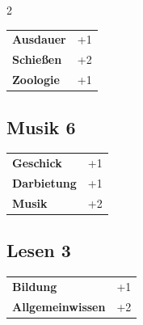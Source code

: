 \begin{multicols}{2}
\begin{tcolorbox}
\begin{tabular}{@{}ll@{}}
    \textbf{Ausdauer} & +1\\
    \textbf{Schießen} & +2\\
    \textbf{Zoologie} & +1\\
\end{tabular}


\end{tcolorbox}

\begin{tcolorbox}
    \subsection*{Musik \hfill \small{6 }}
    \tcblower




\begin{tabular}{@{}ll@{}}
    \textbf{Geschick} & +1\\
    \textbf{Darbietung} & +1\\
    \textbf{Musik} & +2\\
\end{tabular}


\end{tcolorbox}

\begin{tcolorbox}
    \subsection*{Lesen \hfill \small{3 }}
    \tcblower




\begin{tabular}{@{}ll@{}}
    \textbf{Bildung} & +1\\
    \textbf{Allgemeinwissen} & +2\\
\end{tabular}



\end{tcolorbox}
\end{multicols}
